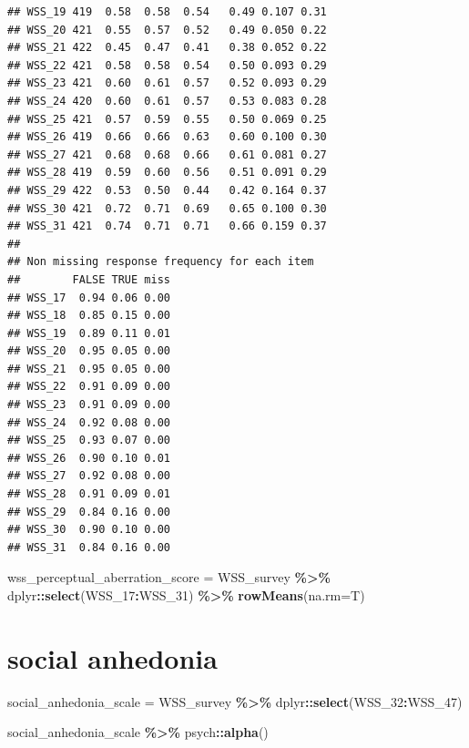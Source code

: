 \documentclass[
]{article}
\newenvironment{Shaded}{\begin{snugshade}}{\end{snugshade}}
\newcommand{\AttributeTok}[1]{\textcolor[rgb]{0.13,0.29,0.53}{#1}}
\newcommand{\FunctionTok}[1]{\textcolor[rgb]{0.13,0.29,0.53}{\textbf{#1}}}
\newcommand{\NormalTok}[1]{#1}
\newcommand{\OtherTok}[1]{\textcolor[rgb]{0.56,0.35,0.01}{#1}}
\newcommand{\SpecialCharTok}[1]{\textcolor[rgb]{0.81,0.36,0.00}{\textbf{#1}}}
\begin{document}
\begin{verbatim}
## WSS_19 419  0.58  0.58  0.54   0.49 0.107 0.31
## WSS_20 421  0.55  0.57  0.52   0.49 0.050 0.22
## WSS_21 422  0.45  0.47  0.41   0.38 0.052 0.22
## WSS_22 421  0.58  0.58  0.54   0.50 0.093 0.29
## WSS_23 421  0.60  0.61  0.57   0.52 0.093 0.29
## WSS_24 420  0.60  0.61  0.57   0.53 0.083 0.28
## WSS_25 421  0.57  0.59  0.55   0.50 0.069 0.25
## WSS_26 419  0.66  0.66  0.63   0.60 0.100 0.30
## WSS_27 421  0.68  0.68  0.66   0.61 0.081 0.27
## WSS_28 419  0.59  0.60  0.56   0.51 0.091 0.29
## WSS_29 422  0.53  0.50  0.44   0.42 0.164 0.37
## WSS_30 421  0.72  0.71  0.69   0.65 0.100 0.30
## WSS_31 421  0.74  0.71  0.71   0.66 0.159 0.37
## 
## Non missing response frequency for each item
##        FALSE TRUE miss
## WSS_17  0.94 0.06 0.00
## WSS_18  0.85 0.15 0.00
## WSS_19  0.89 0.11 0.01
## WSS_20  0.95 0.05 0.00
## WSS_21  0.95 0.05 0.00
## WSS_22  0.91 0.09 0.00
## WSS_23  0.91 0.09 0.00
## WSS_24  0.92 0.08 0.00
## WSS_25  0.93 0.07 0.00
## WSS_26  0.90 0.10 0.01
## WSS_27  0.92 0.08 0.00
## WSS_28  0.91 0.09 0.01
## WSS_29  0.84 0.16 0.00
## WSS_30  0.90 0.10 0.00
## WSS_31  0.84 0.16 0.00
\end{verbatim}

\begin{Shaded}
\begin{Highlighting}[]
\NormalTok{wss\_perceptual\_aberration\_score }\OtherTok{=}\NormalTok{ WSS\_survey }\SpecialCharTok{\%\textgreater{}\%}\NormalTok{ dplyr}\SpecialCharTok{::}\FunctionTok{select}\NormalTok{(WSS\_17}\SpecialCharTok{:}\NormalTok{WSS\_31) }\SpecialCharTok{\%\textgreater{}\%} \FunctionTok{rowMeans}\NormalTok{(}\AttributeTok{na.rm=}\NormalTok{T)}
\end{Highlighting}
\end{Shaded}

\section{social anhedonia}\label{social-anhedonia}

\begin{Shaded}
\begin{Highlighting}[]
\NormalTok{social\_anhedonia\_scale }\OtherTok{=}\NormalTok{ WSS\_survey }\SpecialCharTok{\%\textgreater{}\%}\NormalTok{ dplyr}\SpecialCharTok{::}\FunctionTok{select}\NormalTok{(WSS\_32}\SpecialCharTok{:}\NormalTok{WSS\_47)}

\NormalTok{social\_anhedonia\_scale }\SpecialCharTok{\%\textgreater{}\%}\NormalTok{ psych}\SpecialCharTok{::}\FunctionTok{alpha}\NormalTok{()}
\end{Highlighting}
\end{Shaded}
\end{document}
